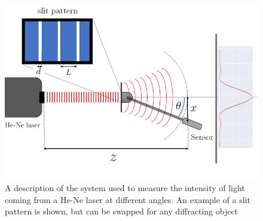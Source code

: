 \begin{figure}[H]
    \centering
    \includegraphics[width=0.9\columnwidth]{figures/Apparatus.JPG}
    \caption{A description of the system used to measure the intensity of light coming from a He-Ne laser at different angles. An example of a slit
    pattern is shown, but can be swapped for any diffracting object}
    \label{fig:Apparatus}
\end{figure}